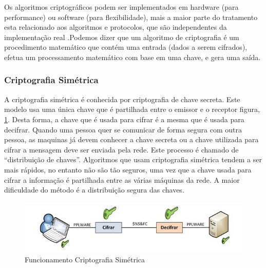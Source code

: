 \documentclass[12pt]{article}
\begin{document}
Os algoritmos criptográficos podem ser implementados em hardware (para performance) ou software (para flexibilidade), mais a maior parte do tratamento esta relacionado aos algoritmos e protocolos, que são independentes da implementação real \cite{TANENBAUM:03}.Podemos dizer que um algoritmo de criptografia é um procedimento matemático que contém uma entrada (dados a serem cifrados), efetua um processamento matemático com base em uma chave, e gera uma saída.

\subsubsection{Criptografia Simétrica}


A criptografia simétrica é conhecida por criptografia de chave secreta. Este modelo usa uma única chave que é partilhada entre o emissor e o receptor figura, \ref{cripto1}. Desta forma, a chave que é usada para cifrar é a mesma que é usada para decifrar. Quando  uma pessoa  quer  se  comunicar  de  forma  segura  com  outra  pessoa, as maquinas já devem conhecer a chave secreta ou a chave utilizada para cifrar a mensagem deve ser enviada pela rede. Este processo é chamado de “distribuição de chaves”. Algoritmos que usam criptografia simétrica tendem a ser mais rápidos, no entanto não são tão seguros, uma vez que a chave usada para cifrar a informação é partilhada entre as várias máquinas da rede. A maior dificuldade do método é a distribuição segura das chaves\cite{BURNETT:02}.

 \begin{figure}[h!]
	\centering
	\includegraphics[]{Simetrica.JPG}
	\caption{Funcionamento Criptografia Simétrica}
	\label{cripto1}
\end{figure}
\end{document}
